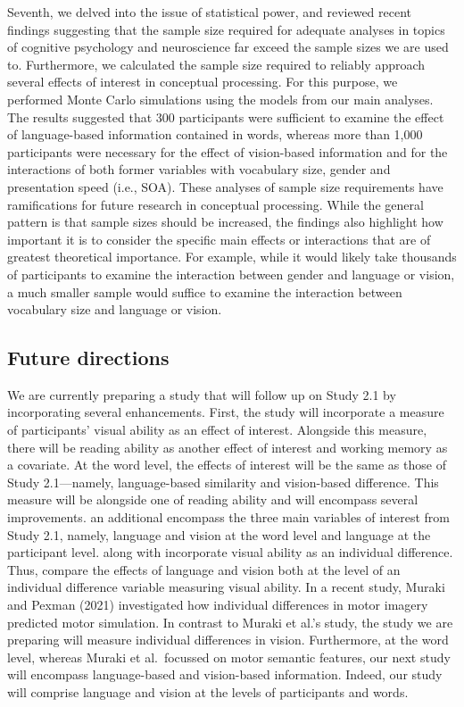 \documentclass[
  12pt,
  man,floatsintext]{apa7}
\begin{document}
Seventh, we delved into the issue of statistical power, and reviewed recent findings suggesting that the sample size required for adequate analyses in topics of cognitive psychology and neuroscience far exceed the sample sizes we are used to. Furthermore, we calculated the sample size required to reliably approach several effects of interest in conceptual processing. For this purpose, we performed Monte Carlo simulations using the models from our main analyses. The results suggested that 300 participants were sufficient to examine the effect of language-based information contained in words, whereas more than 1,000 participants were necessary for the effect of vision-based information and for the interactions of both former variables with vocabulary size, gender and presentation speed (i.e., SOA). These analyses of sample size requirements have ramifications for future research in conceptual processing. While the general pattern is that sample sizes should be increased, the findings also highlight how important it is to consider the specific main effects or interactions that are of greatest theoretical importance. For example, while it would likely take thousands of participants to examine the interaction between gender and language or vision, a much smaller sample would suffice to examine the interaction between vocabulary size and language or vision.

\hypertarget{future-directions}{%
\subsection{Future directions}\label{future-directions}}

We are currently preparing a study that will follow up on Study 2.1 by incorporating several enhancements. First, the study will incorporate a measure of participants' visual ability as an effect of interest. Alongside this measure, there will be reading ability as another effect of interest and working memory as a covariate. At the word level, the effects of interest will be the same as those of Study 2.1---namely, language-based similarity and vision-based difference. This measure will be alongside one of reading ability and will encompass several improvements. an additional encompass the three main variables of interest from Study 2.1, namely, language and vision at the word level and language at the participant level. along with incorporate visual ability as an individual difference. Thus, compare the effects of language and vision both at the level of an individual difference variable measuring visual ability. In a recent study, Muraki and Pexman (2021) investigated how individual differences in motor imagery predicted motor simulation. In contrast to Muraki et al.'s study, the study we are preparing will measure individual differences in vision. Furthermore, at the word level, whereas Muraki et al.~focussed on motor semantic features, our next study will encompass language-based and vision-based information. Indeed, our study will comprise language and vision at the levels of participants and words.
\end{document}
